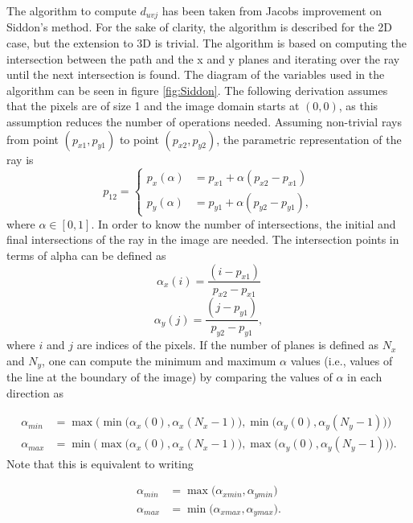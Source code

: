 The algorithm to compute $d_{uvj}$ has been taken from Jacobs\cite{jacobs1998fast} improvement on Siddon's method\cite{siddon1985fast}. For the sake of clarity, the algorithm is described for the 2D case, but the extension to 3D is trivial. The algorithm is based on computing the intersection between the path and the x and y planes and iterating over the ray until the next intersection is found. The diagram of the variables used in the algorithm can be seen in figure \ref{fig:Siddon}. The following derivation assumes that the pixels are of size 1 and the image domain starts at $(0,0)$, as this assumption reduces the number of operations needed. Assuming non-trivial rays from point $(p_{x1},p_{y1})$ to point $(p_{x2},p_{y2})$, the parametric representation of the ray is
\begin{equation}
p_{12}=
\begin{cases}
      p_x(\alpha)&=p_{x1}+\alpha (p_{x2}-p_{x1})\\
      p_y(\alpha)&=p_{y1}+\alpha (p_{y2}-p_{y1}),\label{eq:line}
    \end{cases}
\end{equation}
where $\alpha \in [0,1]$. In order to know the number of intersections, the initial and final intersections of the ray in the image are needed. The intersection points in terms of alpha can be defined as
\begin{equation}
\alpha_x(i) = \frac{(i-p_{x1})}{p_{x2}-p_{x1}}\label{eq:alphax}
\end{equation}
\begin{equation}
\alpha_y(j) = \frac{(j-p_{y1})}{p_{y2}-p_{y1}},\label{eq:alphay}
\end{equation}
where $i$ and $j$ are indices of the pixels. If the number of planes is defined as $N_x$ and $N_y$, one can compute the minimum and maximum $\alpha$ values (i.e., values of the line at the boundary of the image) by comparing the values of $\alpha$ in each direction as

\begin{align}
\alpha_{min}&=\max \Big(\min \big(\alpha_x(0),\alpha_x(N_x-1)  \big), \min \big(\alpha_y(0),\alpha_y(N_y-1)  \big) \Big)\\
\alpha_{max}&=\min \Big(\max \big(\alpha_x(0),\alpha_x(N_x-1)  \big), \max \big(\alpha_y(0),\alpha_y(N_y-1)  \big) \Big).
\end{align}
Note that this is equivalent to writing

\begin{align}
\alpha_{min}&=\max \Big( \alpha_{xmin},\alpha_{ymin} \Big)\\
\alpha_{max}&=\min \Big( \alpha_{xmax},\alpha_{ymax}\Big).
\end{align}

